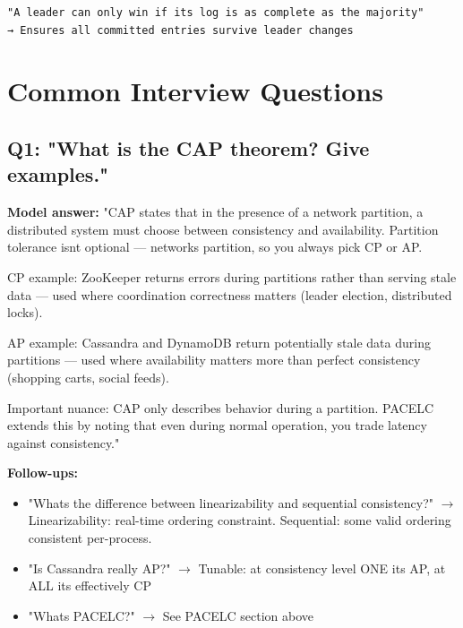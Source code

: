\documentclass[11pt]{article}
\providecommand{\tightlist}{\setlength{\itemsep}{1pt}\setlength{\parskip}{0pt}}
\begin{document}
\setcodelang{}

\begin{verbatim}
"A leader can only win if its log is as complete as the majority"
→ Ensures all committed entries survive leader changes
\end{verbatim}

\section{Common Interview Questions}\label{common-interview-questions}

\subsection{Q1: "What is the CAP theorem? Give examples."}\label{q1-what-is-the-cap-theorem-give-examples}

\textbf{Model answer:}
"CAP states that in the presence of a network partition, a distributed system must choose between consistency and availability. Partition tolerance isn\textquotesingle t optional --- networks partition, so you always pick CP or AP.

CP example: ZooKeeper returns errors during partitions rather than serving stale data --- used where coordination correctness matters (leader election, distributed locks).

AP example: Cassandra and DynamoDB return potentially stale data during partitions --- used where availability matters more than perfect consistency (shopping carts, social feeds).

Important nuance: CAP only describes behavior during a partition. PACELC extends this by noting that even during normal operation, you trade latency against consistency."

\textbf{Follow-ups:}

\begin{itemize}
\tightlist
\item
  "What\textquotesingle s the difference between linearizability and sequential consistency?" \(\rightarrow\) Linearizability: real-time ordering constraint. Sequential: some valid ordering consistent per-process.
\item
  "Is Cassandra really AP?" \(\rightarrow\) Tunable: at consistency level ONE it\textquotesingle s AP, at ALL it\textquotesingle s effectively CP
\item
  "What\textquotesingle s PACELC?" \(\rightarrow\) See PACELC section above
\end{itemize}
\end{document}

